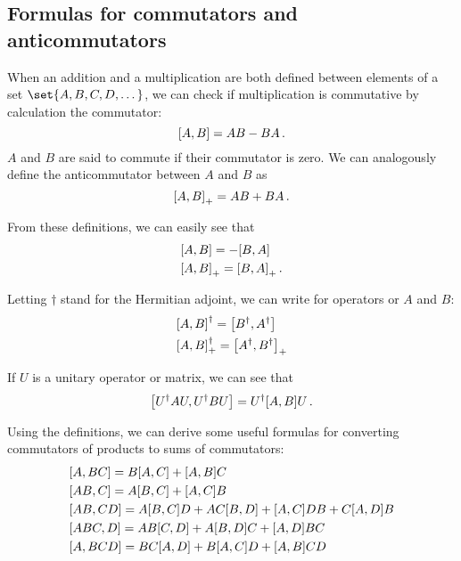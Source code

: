 \subsection{Formulas for commutators and anticommutators}
        When an addition and a multiplication are both defined between elements of a set $\set{A, B, C, D, \dots}$, we can check if multiplication is commutative by calculation the commutator:
        \begin{equation}
            \comm{A}{B} = AB - BA \thinspace .
        \end{equation}
        $A$ and $B$ are said to commute if their commutator is zero. We can analogously define the anticommutator between $A$ and $B$ as
        \begin{equation}
            \comm{A}{B}_+ = AB + BA \thinspace .
        \end{equation}

        From these definitions, we can easily see that
        \begin{align}
            & \comm{A}{B} = - \comm{B}{A} \\
            & \comm{A}{B}_+ = \comm{B}{A}_+ \thinspace .
        \end{align}

        Letting $\dagger$ stand for the Hermitian adjoint, we can write for operators or $A$ and $B$:
        \begin{align}
            & \comm{A}{B}^\dagger = \comm{B^\dagger}{A^\dagger} \\
            & \comm{A}{B}^\dagger_+ = \comm{A^\dagger}{B^\dagger}_+
        \end{align}

        If $U$ is a unitary operator or matrix, we can see that
        \begin{equation}
            \comm{U^\dagger A U}{U^\dagger B U } = U^\dagger \comm{A}{B} U \thinspace .
        \end{equation}

        Using the definitions, we can derive some useful formulas for converting commutators of products to sums of commutators:
        \begin{align}
            & \comm{A}{BC} = B \comm{A}{C} + \comm{A}{B} C \\
            & \comm{AB}{C} = A \comm{B}{C} + \comm{A}{C}B \\
            & \comm{AB}{CD} = A \comm{B}{C} D + AC \comm{B}{D} + \comm{A}{C} DB + C \comm{A}{D} B \\
            & \comm{ABC}{D} = AB \comm{C}{D} + A \comm{B}{D} C + \comm{A}{D} BC \\
            & \comm{A}{BCD} = BC \comm{A}{D} + B \comm{A}{C} D + \comm{A}{B} CD
        \end{align}

